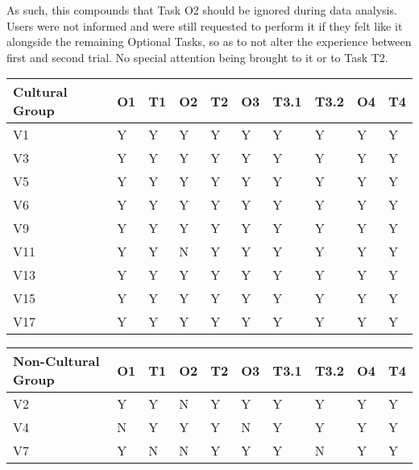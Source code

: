     As such, this compounds that Task O2 should be ignored during data analysis. Users were not informed and were still requested to perform it if they felt like it alongside the remaining Optional Tasks, so as to not alter the experience between first and second trial. No special attention being brought to it or to Task T2.\\


    \begin{table}[ht]
    \begin{tabular}{|l|l|l|l|l|l|l|l|l|l|}
    \hline
    Cultural Group & O1 & T1 & O2             & T2 & O3 & T3.1 & T3.2 & O4 & T4 \\ \hline
    V1  & Y  & Y  & Y                         & Y  & Y  & Y    & Y    & Y  & Y  \\ \hline
    V3  & Y  & Y  & Y                         & Y  & Y  & Y    & Y    & Y  & Y  \\ \hline
    V5  & Y  & Y  & Y                         & Y  & Y  & Y    & Y    & Y  & Y  \\ \hline
    V6  & Y  & Y  & Y                         & Y  & Y  & Y    & Y    & Y  & Y  \\ \hline
    V9  & Y  & Y  & Y                         & Y  & Y  & Y    & Y    & Y  & Y  \\ \hline
    V11 & Y  & Y  & \cellcolor[HTML]{FFE7E6}N & Y  & Y  & Y    & Y    & Y  & Y  \\ \hline
    V13 & Y  & Y  & Y                         & Y  & Y  & Y    & Y    & Y  & Y  \\ \hline
    V15 & Y  & Y  & Y                         & Y  & Y  & Y    & Y    & Y  & Y  \\ \hline
    V17 & Y  & Y  & Y                         & Y  & Y  & Y    & Y    & Y  & Y  \\ \hline
    \end{tabular}
    \newline
    \newline
    \newline
    \begin{tabular}{|l|l|l|l|l|l|l|l|l|l|}
    \hline
    Non-Cultural Group & O1 & T1 & O2 & T2 & O3 & T3.1 & T3.2 & O4 & T4 \\ \hline
    V2 & Y & Y & \cellcolor[HTML]{FFE7E6}N & Y & Y & Y & Y & Y & Y \\ \hline
    V4 & \cellcolor[HTML]{FFE7E6}N & Y & Y & Y & \cellcolor[HTML]{FFE7E6}N & Y & Y & Y & Y \\ \hline
    V7 & Y & \cellcolor[HTML]{FFE7E6}N & \cellcolor[HTML]{FFE7E6}N & Y & Y & Y & \cellcolor[HTML]{FFE7E6}N & Y & Y \\ \hline

\end{tabular}
\end{table}
